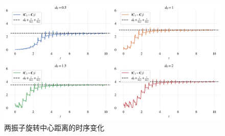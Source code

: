 \documentclass{article}
\begin{document}
\begin{figure}[H]
	\centering
	\includegraphics[width=\textwidth]{./figs/2particalCentersDis.png}
	\vspace{-0.5cm}
	\caption{两振子旋转中心距离的时序变化}
	\label{fig:fig2.6.centerDis}
\end{figure}
\end{document}
